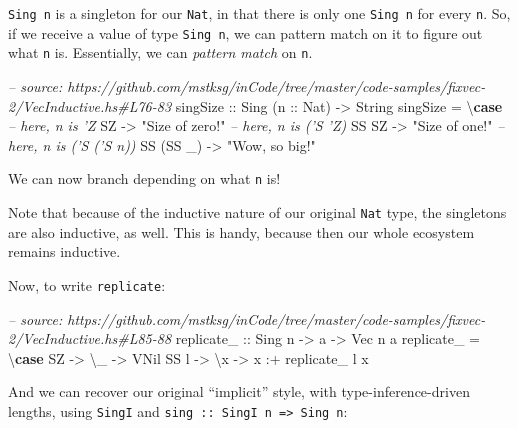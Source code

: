 \documentclass[]{article}
\newenvironment{Shaded}{}{}
\newcommand{\KeywordTok}[1]{\textcolor[rgb]{0.00,0.44,0.13}{\textbf{#1}}}
\newcommand{\DataTypeTok}[1]{\textcolor[rgb]{0.56,0.13,0.00}{#1}}
\newcommand{\StringTok}[1]{\textcolor[rgb]{0.25,0.44,0.63}{#1}}
\newcommand{\CommentTok}[1]{\textcolor[rgb]{0.38,0.63,0.69}{\textit{#1}}}
\newcommand{\OtherTok}[1]{\textcolor[rgb]{0.00,0.44,0.13}{#1}}
\newcommand{\FunctionTok}[1]{\textcolor[rgb]{0.02,0.16,0.49}{#1}}
\newcommand{\NormalTok}[1]{#1}
\begin{document}
\texttt{Sing\ n} is a singleton for our \texttt{Nat}, in that there is only one
\texttt{Sing\ n} for every \texttt{n}. So, if we receive a value of type
\texttt{Sing\ n}, we can pattern match on it to figure out what \texttt{n} is.
Essentially, we can \emph{pattern match} on \texttt{n}.

\begin{Shaded}
\begin{Highlighting}[]
\CommentTok{-- source: https://github.com/mstksg/inCode/tree/master/code-samples/fixvec-2/VecInductive.hs#L76-83}
\OtherTok{singSize ::} \DataTypeTok{Sing}\NormalTok{ (}\OtherTok{n ::} \DataTypeTok{Nat}\NormalTok{) }\OtherTok{->} \DataTypeTok{String}
\NormalTok{singSize }\FunctionTok{=}\NormalTok{ \textbackslash{}}\KeywordTok{case}
    \CommentTok{-- here, n is 'Z}
    \DataTypeTok{SZ}        \OtherTok{->} \StringTok{"Size of zero!"}
    \CommentTok{-- here, n is ('S 'Z)}
    \DataTypeTok{SS} \DataTypeTok{SZ}     \OtherTok{->} \StringTok{"Size of one!"}
    \CommentTok{-- here, n is ('S ('S n))}
    \DataTypeTok{SS}\NormalTok{ (}\DataTypeTok{SS}\NormalTok{ _) }\OtherTok{->} \StringTok{"Wow, so big!"}
\end{Highlighting}
\end{Shaded}

We can now branch depending on what \texttt{n} is!

Note that because of the inductive nature of our original \texttt{Nat} type, the
singletons are also inductive, as well. This is handy, because then our whole
ecosystem remains inductive.

Now, to write \texttt{replicate}:

\begin{Shaded}
\begin{Highlighting}[]
\CommentTok{-- source: https://github.com/mstksg/inCode/tree/master/code-samples/fixvec-2/VecInductive.hs#L85-88}
\OtherTok{replicate_ ::} \DataTypeTok{Sing}\NormalTok{ n }\OtherTok{->}\NormalTok{ a }\OtherTok{->} \DataTypeTok{Vec}\NormalTok{ n a}
\NormalTok{replicate_ }\FunctionTok{=}\NormalTok{ \textbackslash{}}\KeywordTok{case}
    \DataTypeTok{SZ}   \OtherTok{->}\NormalTok{ \textbackslash{}_ }\OtherTok{->} \DataTypeTok{VNil}
    \DataTypeTok{SS}\NormalTok{ l }\OtherTok{->}\NormalTok{ \textbackslash{}x }\OtherTok{->}\NormalTok{ x }\FunctionTok{:+}\NormalTok{ replicate_ l x}
\end{Highlighting}
\end{Shaded}

And we can recover our original ``implicit'' style, with type-inference-driven
lengths, using \texttt{SingI} and
\texttt{sing\ ::\ SingI\ n\ =\textgreater{}\ Sing\ n}:
\end{document}
